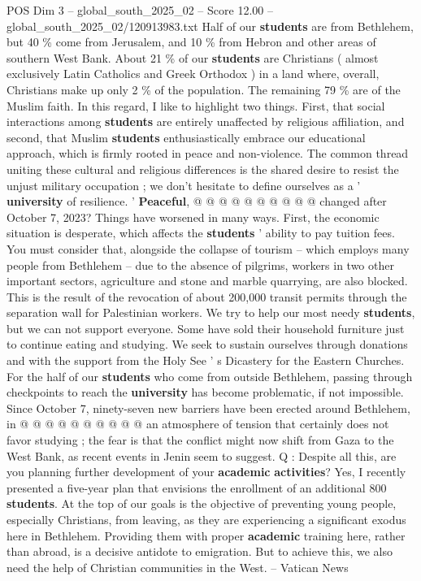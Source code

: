 \begin{textsample}{POS Dim 3 – global\_south\_2025\_02 – Score 12.00 – global\_south\_2025\_02/120913983.txt}
Half of our \textbf{students} are from Bethlehem, but 40 \% come from Jerusalem, and 10 \% from Hebron and other areas of southern West Bank.
About 21 \% of our \textbf{students} are Christians ( almost exclusively Latin Catholics and Greek Orthodox ) in a land where, overall, Christians make up only 2 \% of the population.
The remaining 79 \% are of the Muslim faith.
In this regard, I like to highlight two things.
First, that social interactions among \textbf{students} are entirely unaffected by religious affiliation, and second, that Muslim \textbf{students} enthusiastically embrace our educational approach, which is firmly rooted in peace and non-violence.
The common thread uniting these cultural and religious differences is the shared desire to resist the unjust military occupation ; we don't hesitate to define ourselves as a ' \textbf{university} of resilience. ' \textbf{Peaceful}, @ @ @ @ @ @ @ @ @ @ changed after October 7, 2023?
Things have worsened in many ways.
First, the economic situation is desperate, which affects the \textbf{students} ' ability to pay tuition fees.
You must consider that, alongside the collapse of tourism -- which employs many people from Bethlehem -- due to the absence of pilgrims, workers in two other important sectors, agriculture and stone and marble quarrying, are also blocked.
This is the result of the revocation of about 200,000 transit permits through the separation wall for Palestinian workers.
We try to help our most needy \textbf{students}, but we can not support everyone.
Some have sold their household furniture just to continue eating and studying.
We seek to sustain ourselves through donations and with the support from the Holy See ' s Dicastery for the Eastern Churches.
For the half of our \textbf{students} who come from outside Bethlehem, passing through checkpoints to reach the \textbf{university} has become problematic, if not impossible.
Since October 7, ninety-seven new barriers have been erected around Bethlehem, in @ @ @ @ @ @ @ @ @ @ an atmosphere of tension that certainly does not favor studying ; the fear is that the conflict might now shift from Gaza to the West Bank, as recent events in Jenin seem to suggest.
Q : Despite all this, are you planning further development of your \textbf{academic} \textbf{activities}?
Yes, I recently presented a five-year plan that envisions the enrollment of an additional 800 \textbf{students}.
At the top of our goals is the objective of preventing young people, especially Christians, from leaving, as they are experiencing a significant exodus here in Bethlehem.
Providing them with proper \textbf{academic} training here, rather than abroad, is a decisive antidote to emigration.
But to achieve this, we also need the help of Christian communities in the West. -- Vatican News

\end{textsample}
